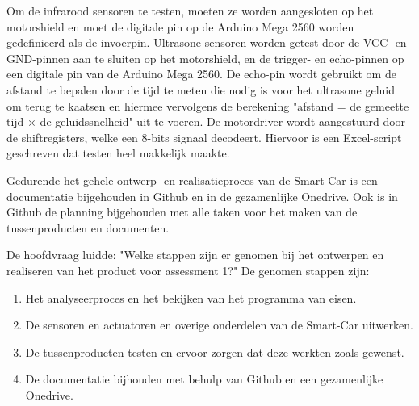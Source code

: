  Om de infrarood sensoren\cite{IR-datasheet} te testen, moeten ze worden aangesloten op het \gls{motorshield} en moet de digitale pin op de Arduino Mega 2560\cite{ArduinoMEGA} worden gedefinieerd als de invoerpin. Ultrasone sensoren worden getest door de VCC- en GND-pinnen aan te sluiten op het \gls{motorshield}, en de trigger- en echo-pinnen op een digitale pin van de Arduino Mega 2560\cite{ArduinoMEGA}. De echo-pin wordt gebruikt om de afstand te bepalen door de tijd te meten die nodig is voor het ultrasone geluid om terug te kaatsen en hiermee vervolgens de berekening "afstand = de gemeette tijd × de geluidssnelheid" uit te voeren. De motordriver\cite{h-brug} wordt aangestuurd door de shiftregisters\cite{shiftregister}, welke een 8-bits signaal decodeert. Hiervoor is een Excel-script geschreven dat testen heel makkelijk maakte.

 Gedurende het gehele ontwerp- en realisatieproces van de \gls{Smart-Car} is een documentatie bijgehouden in Github en in de gezamenlijke Onedrive. Ook is in Github de planning bijgehouden met alle taken voor het maken van de tussenproducten en documenten. 

De hoofdvraag luidde: "Welke stappen zijn er genomen bij het ontwerpen en realiseren van het product voor assessment 1?" De genomen stappen zijn: 
\begin{enumerate}
    \item Het analyseerproces en het bekijken van het programma van eisen.
    \item De sensoren en actuatoren en overige onderdelen van de \gls{Smart-Car} uitwerken.
    \item De tussenproducten testen en ervoor zorgen dat deze werkten zoals gewenst.
    \item De documentatie bijhouden met behulp van Github en een gezamenlijke Onedrive. 
\end{enumerate}
